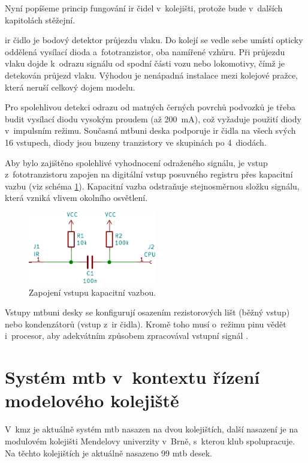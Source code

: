 Nyní popíšeme princip fungování \gls{ir} čidel v~kolejišti, protože bude v~dalších
kapitolách stěžejní.

\gls{ir} čidlo je bodový detektor průjezdu vlaku. Do kolejí se vedle sebe umístí
opticky oddělená vysílací dioda a~fototranzistor, oba namířené vzhůru. Při
průjezdu vlaku dojde k~odrazu signálu od spodní části vozu nebo lokomotivy,
čímž je detekován průjezd vlaku. Výhodou je nenápadná instalace mezi kolejové
pražce, která neruší celkový dojem modelu.

Pro spolehlivou detekci odrazu od matných černých povrchů podvozků je třeba
budit vysílací diodu vysokým proudem (až 200~mA), což vyžaduje použití
diody v~impulsním režimu. Současná \gls{mtbuni} deska podporuje \gls{ir} čidla na
všech svých 16 vstupech, diody jsou buzeny tranzistory ve skupinách po
4~diodách.

Aby bylo zajištěno spolehlivé vyhodnocení odraženého signálu, je vstup
z~fototranzistoru zapojen na digitální vstup posuvného registru přes kapacitní
vazbu (viz schéma \ref{fig:cap-bind}). Kapacitní vazba odstraňuje stejnosměrnou
složku signálu, která vzniká vlivem okolního osvětlení.

\begin{figure}[ht]
\includegraphics[width=0.5\textwidth]{data/cap-bind/capacitive-bind-example.pdf}
\caption{Zapojení vstupu kapacitní vazbou.}
\label{fig:cap-bind}
\end{figure}

Vstupy \gls{mtbuni} desky se konfigurují osazením rezistorových lišt (běžný
vstup) nebo kondenzátorů (vstup z~\gls{ir} čidla). Kromě toho musí o~režimu pinu
vědět i~procesor, aby adekvátním způsobem zpracovával vstupní signál
\cite{mtbuni22-specs}.


\section{Systém \gls{mtb} v~kontextu řízení modelového kolejiště} \label{sec:mtb_context}

V~\gls{kmz} je aktuálně systém \gls{mtb} nasazen na dvou kolejištích, další
nasazení je na modulovém kolejišti Mendelovy univerzity v~Brně, s~kterou klub
spolupracuje. Na těchto kolejištích je aktuálně nasazeno 99 \gls{mtb} desek.

